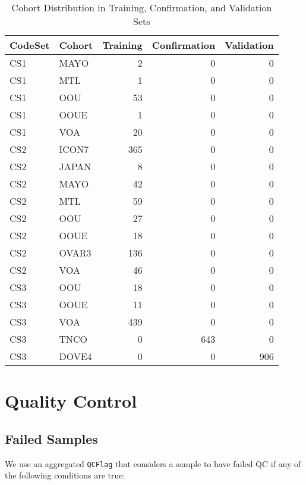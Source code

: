 \documentclass[
]{report}
\begin{document}
\begin{table}

\caption{\label{tab:cohort-dist}Cohort Distribution in Training, Confirmation, and Validation Sets}
\centering
\begin{tabular}[t]{l|l|r|r|r}
\hline
CodeSet & Cohort & Training & Confirmation & Validation\\
\hline
CS1 & MAYO & 2 & 0 & 0\\
\hline
CS1 & MTL & 1 & 0 & 0\\
\hline
CS1 & OOU & 53 & 0 & 0\\
\hline
CS1 & OOUE & 1 & 0 & 0\\
\hline
CS1 & VOA & 20 & 0 & 0\\
\hline
CS2 & ICON7 & 365 & 0 & 0\\
\hline
CS2 & JAPAN & 8 & 0 & 0\\
\hline
CS2 & MAYO & 42 & 0 & 0\\
\hline
CS2 & MTL & 59 & 0 & 0\\
\hline
CS2 & OOU & 27 & 0 & 0\\
\hline
CS2 & OOUE & 18 & 0 & 0\\
\hline
CS2 & OVAR3 & 136 & 0 & 0\\
\hline
CS2 & VOA & 46 & 0 & 0\\
\hline
CS3 & OOU & 18 & 0 & 0\\
\hline
CS3 & OOUE & 11 & 0 & 0\\
\hline
CS3 & VOA & 439 & 0 & 0\\
\hline
CS3 & TNCO & 0 & 643 & 0\\
\hline
CS3 & DOVE4 & 0 & 0 & 906\\
\hline
\end{tabular}
\end{table}

\section{Quality Control}\label{quality-control-1}

\subsection{Failed Samples}\label{failed-samples}

We use an aggregated \texttt{QCFlag} that considers a sample to have failed QC if any of the following conditions are true:
\end{document}

